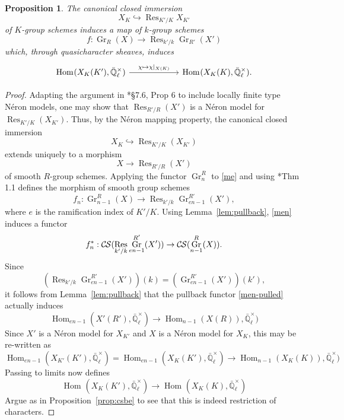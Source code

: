 \documentclass[10pt]{amsart}
\theoremstyle{plain}
\newtheorem{proposition}[theorem]{Proposition}
\theoremstyle{definition}
\theoremstyle{remark}
\newcommand{\EE}{\mathbb{\bar Q}_\ell}
\newcommand{\Fq}{k}
\newcommand{\EEx}{\EE^\times}
\DeclareMathOperator{\Hom}{Hom}
\DeclareMathOperator{\Gr}{Gr}
\DeclareMathOperator{\Res}{Res}
\newcommand{\CS}{{\mathcal{C\hskip-0.8pt S}}}
\begin{document}
\begin{proposition}\label{prop:wrK}
The canonical closed immersion 
\[
X_K \hookrightarrow \Res_{K'/K} X_{K'}
\]
of $K$-group schemes
induces a map of $\Fq$-group schemes 
\[
f : \Gr_R(X) \to \Res_{k'/k} \Gr_{R'}(X')
\] 
which, through quasicharacter sheaves, induces
\[
\begin{tikzcd}[column sep=60]
\Hom_{\text{}}(X_K(K'), \EEx) \arrow{r}{\chi \mapsto \chi\vert_{X(K)}} &\Hom_{\text{}}(X_K(K), \EEx).
\end{tikzcd}
\]
\end{proposition}

\begin{proof}
Adapting the argument in \cite{bosch-lutkebohmert-reynaud:NeronModels}*{\S 7.6, Prop 6} to include locally finite type N\'eron models,
one may show that $\Res_{R'/R}(X')$ is a N\'eron model for $\Res_{K'/K}(X_{K'})$.
Thus, by the N\'eron mapping property, the canonical closed immersion
\[
X_K\hookrightarrow \Res_{K'/K}(X_{K'})
\]
 extends uniquely to a morphism
\begin{equation}\label{me}
X\to \Res_{R'/R}(X')
\end{equation}
 of smooth $R$-group schemes.
%
Applying the functor $\Gr^R_{n}$ to \eqref{me}
and using \cite{bertrapelle-gonzales:Greenberg}*{Thm 1.1} defines the morphism of smooth group schemes
\begin{equation}\label{men}
f_n: \Gr_{n-1}^R(X) \to \Res_{k'/k} \Gr_{en-1}^{R'}(X'),
\end{equation}
where $e$ is the ramification index of $K'/K$.
Using Lemma~\ref{lem:pullback}, \eqref{men} induces a functor 
\begin{equation}\label{men-pulled}
f_n^* : \CS(\Res_{k'/k} \Gr_{en-1}^{R'}(X'))\to \CS(\Gr_{n-1}^{R}(X)).
\end{equation}
Since 
\[
\left(\Res_{k'/k} \Gr_{en-1}^{R'}(X') \right)(\Fq) = \left(\Gr_{en-1}^{R'}(X')\right)(k'),
\]
it follows from Lemma~\ref{lem:pullback} that the pullback functor \eqref{men-pulled} actually induces
\[ 
\Hom_{en-1}(X'(R'),\EEx) \to \Hom_{n-1}(X(R)),\EEx)
\]
Since $X'$ is a N\'eron model for $X_{K'}$ and $X$ is a N\'eron model for $X_K$,
 this may be re-written as
 \[ 
\Hom_{en-1}(X_{K'}(K'),\EEx)= \Hom_{en-1}(X_{K}(K'),\EEx) \to \Hom_{n-1}(X_K(K)),\EEx)
\]
Passing to limits now defines
\[ 
\Hom_\text{}(X_K(K'),\EEx) \to \Hom_\text{}(X_K(K),\EEx)
\]
Argue as in Proposition~\ref{prop:csbe} to see that this is indeed restriction of characters.
\end{proof}
\end{document}

